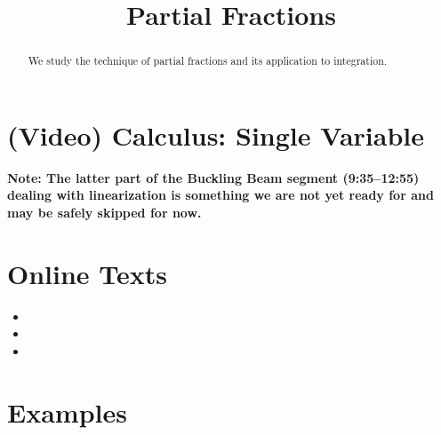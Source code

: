 \documentclass{ximera}
\title{Partial Fractions}
\begin{document}
\begin{abstract}
We study the technique of partial fractions and its application to integration.
\end{abstract}
\maketitle

\section*{(Video) Calculus: Single Variable}

\textbf{Note: The latter part of the Buckling Beam segment (9:35--12:55) dealing with linearization is something we are not yet ready for and may be safely skipped for now.}

\section*{Online Texts}
\begin{itemize}
\item {}
\item {}
\item {}
\end{itemize}


\section*{Examples}
\end{document}
